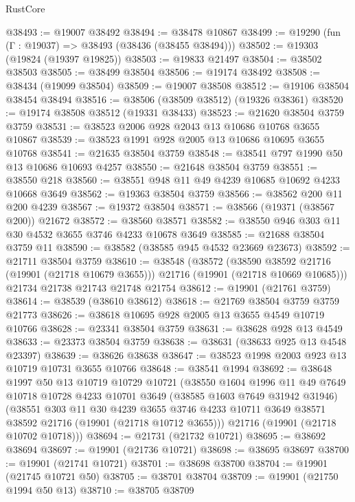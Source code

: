 \begin{lexlean}{RustCore}
\begin{coremodule}
@38493 := @19007 @38492
@38494 := @38478 @10867
@38499 := @19290 (fun (Γ : @19037) => @38493 (@38436 (@38455 @38494)))
@38502 := @19303 (@19824 (@19397 @19825))
@38503 := @19833 @21497
@38504 := @38502 @38503
@38505 := @38499 @38504
@38506 := @19174 @38492
@38508 := @38434 (@19099 @38504)
@38509 := @19007 @38508
@38512 := @19106 @38504 @38454 @38494
@38516 := @38506 (@38509 @38512) (@19326 @38361)
@38520 := @19174 @38508 @38512 (@19331 @38433)
@38523 := @21620 @38504 @3759 @3759
@38531 := @38523 @2006 @928 @2043 @13 @10686 @10768 @3655 @10867
@38539 := @38523 @1991 @928 @2005 @13 @10686 @10695 @3655 @10768
@38541 := @21635 @38504 @3759
@38548 := @38541 @797 @1990 @50 @13 @10686 @10693 @4257
@38550 := @21648 @38504 @3759
@38551 := @38550 @218
@38560 := @38551 @948 @11 @49 @4239 @10685 @10692 @4233 @10668 @3649
@38562 := @19363 @38504 @3759
@38566 := @38562 @200 @11 @200 @4239
@38567 := @19372 @38504
@38571 := @38566 (@19371 (@38567 @200)) @21672
@38572 := @38560 @38571
@38582 := @38550 @946 @303 @11 @30 @4532 @3655 @3746 @4233 @10678 @3649
@38585 := @21688 @38504 @3759 @11
@38590 := @38582 (@38585 @945 @4532 @23669 @23673)
@38592 := @21711 @38504 @3759
@38610 := @38548
    (@38572
      (@38590 @38592 @21716 (@19901 (@21718 @10679 @3655)))
      @21716
      (@19901 (@21718 @10669 @10685)))
    @21734
    @21738
    @21743
    @21748
    @21754
@38612 := @19901 (@21761 @3759)
@38614 := @38539 (@38610 @38612)
@38618 := @21769 @38504 @3759 @3759 @21773
@38626 := @38618 @10695 @928 @2005 @13 @3655 @4549 @10719 @10766
@38628 := @23341 @38504 @3759
@38631 := @38628 @928 @13 @4549
@38633 := @23373 @38504 @3759
@38638 := @38631 (@38633 @925 @13 @4548 @23397)
@38639 := @38626 @38638
@38647 := @38523 @1998 @2003 @923 @13 @10719 @10731 @3655 @10766
@38648 := @38541 @1994
@38692 := @38648
    @1997
    @50
    @13
    @10719
    @10729
    @10721
    (@38550
      @1604
      @1996
      @11
      @49
      @7649
      @10718
      @10728
      @4233
      @10701
      @3649
      (@38585 @1603 @7649 @31942 @31946)
      (@38551
        @303
        @11
        @30
        @4239
        @3655
        @3746
        @4233
        @10711
        @3649
        @38571
        @38592
        @21716
        (@19901 (@21718 @10712 @3655)))
      @21716
      (@19901 (@21718 @10702 @10718)))
@38694 := @21731 (@21732 @10721)
@38695 := @38692 @38694
@38697 := @19901 (@21736 @10721)
@38698 := @38695 @38697
@38700 := @19901 (@21741 @10721)
@38701 := @38698 @38700
@38704 := @19901 (@21745 @10721 @50)
@38705 := @38701 @38704
@38709 := @19901 (@21750 @1994 @50 @13)
@38710 := @38705 @38709

\end{coremodule}
\end{lexlean}
